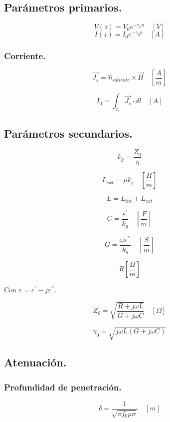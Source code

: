 \documentclass[12pt,a4paper]{article}
\begin{document}
\subsection{Parámetros primarios.}
\label{sub:parametros_primarios}

\[ V(z) = V_0 e^{- \gamma_0 n} \quad [V] \]
\[ I(z) = I_0 e^{- \gamma_0 n} \quad [A] \]

\subsubsection{Corriente.}
\label{ssub:corriente}

\[ \vec{J_s} = \hat{n}_{saliente} \times \vec{H} \quad \left[\frac{A}{m}\right] \]

\[ I_0 = \int_L \vec{J_s} \cdot dl \quad [A] \]

\subsection{Parámetros secundarios.}
\label{sub:parametros_secundarios}

\[ k_g = \frac{Z_0}{\eta} \]

\[ L_{ext} = \mu k_g \quad \left[ \frac{H}{m} \right] \]

\[ L = L_{int} + L_{ext} \]

\[ C = \frac{\varepsilon^{\prime}}{k_g} \quad \left[ \frac{F}{m} \right] \]

\[ G = \frac{\omega \varepsilon^{\prime\prime}}{k_g} \quad \left[ \frac{S}{m} \right] \]

\[ R \left[ \frac{\Omega}{m} \right] \]

Con $ \varepsilon = \varepsilon^{\prime} -j\varepsilon^{\prime\prime} $.

\[ Z_0 = \sqrt{\frac{R + j \omega L}{G + j \omega C}} \quad [\Omega] \]

\[ \gamma_0 =  \sqrt{j \omega L (G + j \omega C )} \]

\subsection{Atenuación.}
\label{sub:atenuacion}

\subsubsection{Profundidad de penetración.}
\label{ssub:profundidad_de_penetracion}

\[ \delta = \frac{1}{\sqrt{\pi f_0 \mu \sigma}} \quad [m] \]
\end{document}
